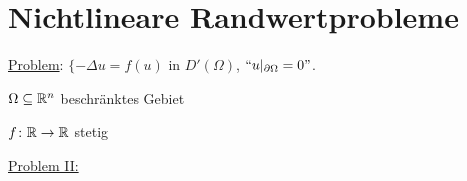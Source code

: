 \section{Nichtlineare Randwertprobleme}

\underline{Problem}: $\{-\Delta u = f(u)$ in $D'(\Omega)$, $``u|_{\partial \Omega} = 0"$.

$\Omega \subseteq \mathbb{R}^n$ beschränktes Gebiet

$f \colon \mathbb{R} \to \mathbb{R}$ stetig

\underline{Problem II:}



